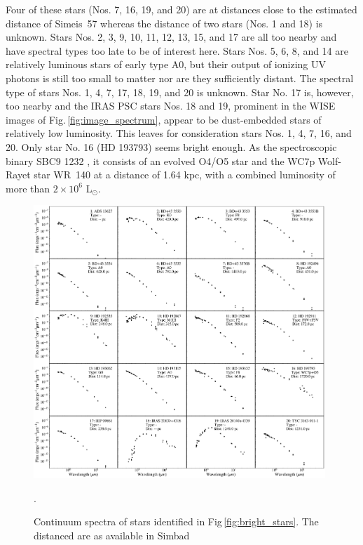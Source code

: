 \documentclass{aa}
\begin{document}
Four of these stars (Nos. 7, 16, 19, and 20) are at distances close to
the estimated distance of Simeis~57 whereas the distance of two stars
(Nos. 1 and 18) is unknown.  Stars Nos. 2, 3, 9, 10, 11, 12, 13, 15,
and 17 are all too nearby and have spectral types too late to be of
interest here.  Stars Nos. 5, 6, 8, and 14 are relatively luminous
stars of early type A0, but their output of ionizing UV photons is
still too small to matter nor are they sufficiently distant. The
spectral type of stars Nos. 1, 4, 7, 17, 18, 19, and 20 is
unknown. Star No. 17 is, however, too nearby and the IRAS PSC stars
Nos. 18 and 19, prominent in the WISE images of
Fig.\,\ref{fig:image_spectrum}, appear to be dust-embedded stars of
relatively low luminosity. This leaves for consideration stars Nos. 1,
4, 7, 16, and 20. Only star No. 16 (HD 193793) seems bright enough.
As the spectroscopic binary SBC9 1232 \citep{Pourbaix2004}, it
consists of an evolved O4/O5 star and the WC7p Wolf-Rayet star WR~140
at a distance of 1.64 kpc, with a combined luminosity of more than
$2\times10^6$ L$_{\odot}$.  \onecolumn
\begin{figure}
\includegraphics[width=0.98\textwidth]{stellar_spectra.pdf}
\centering
\caption{Continuum spectra of stars identified in
  Fig\,\ref{fig:bright_stars}. The distanced are as available in 
  Simbad \citep{simbad2000}}.
\label{fig:stellar_spectra}
\end{figure}
\end{document}
